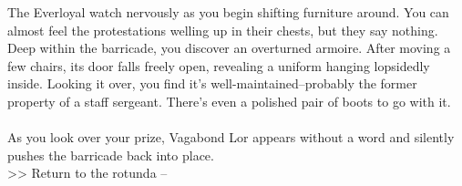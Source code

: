 The Everloyal watch nervously as you begin shifting furniture around. You can almost feel the protestations welling up in their chests, but they say nothing.\\

Deep within the barricade, you discover an overturned armoire. After moving a few chairs, its door falls freely open, revealing a uniform hanging lopsidedly inside. Looking it over, you find it's well-maintained--probably the former property of a staff sergeant. There's even a polished pair of boots to go with it.\\
\\

As you look over your prize, Vagabond Lor appears without a word and silently pushes the barricade back into place.\\

>> Return to the rotunda -- 